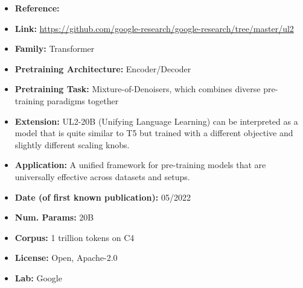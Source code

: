 \documentclass{article}
\begin{document}
            \begin{itemize}
                \item \textbf{Reference:} \href{https://arxiv.org/abs/2205.05131}{}
                \item \textbf{Link:} \url{https://github.com/google-research/google-research/tree/master/ul2}
                \item \textbf{Family:} Transformer
                \item \textbf{Pretraining Architecture:} Encoder/Decoder
                \item \textbf{Pretraining Task:} Mixture-of-Denoisers, which combines diverse pre-training paradigms together
                \item \textbf{Extension:} UL2-20B (Unifying Language Learning) can be interpreted as a model that is quite similar to T5 but trained with a different objective and slightly different scaling knobs.
                \item \textbf{Application:} A unified framework for pre-training models that are universally effective across datasets and setups.
                \item \textbf{Date (of first known publication):} 05/2022
                \item \textbf{Num. Params:} 20B
                \item \textbf{Corpus:} 1 trillion tokens on C4
                \item \textbf{License:} Open, Apache-2.0
                \item \textbf{Lab:} Google
            \end{itemize}



\end{document}
